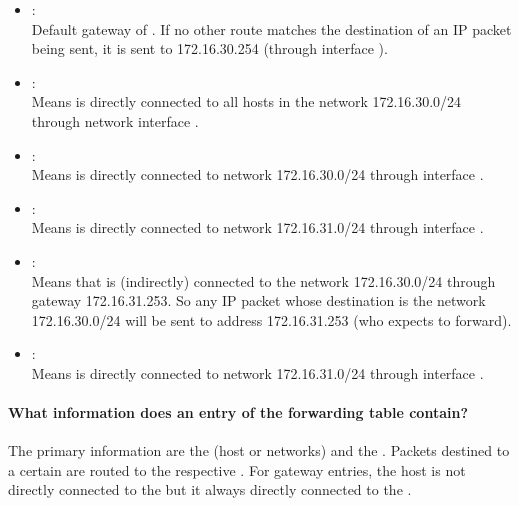 \documentclass[compilation.tex]{subfiles}
\begin{document}
\begin{itemize}[noitemsep, leftmargin=*,topsep=0pt]
\item {}: \\
Default gateway of . If no other route matches the destination of an IP packet being sent, it is sent to 172.16.30.254 (through interface ).

\item {}: \\
Means  is directly connected to all hosts in the network 172.16.30.0/24 through network interface .

\item {}: \\
Means  is directly connected to network 172.16.30.0/24 through interface .
\end{itemize}%

\begin{itemize}[noitemsep, leftmargin=*,topsep=0pt]
\item {}: \\
Means  is directly connected to network 172.16.31.0/24 through interface .

\item {}: \\
Means that  is (indirectly) connected to the network 172.16.30.0/24 through gateway 172.16.31.253. So any IP packet whose destination is the network 172.16.30.0/24 will be sent to address 172.16.31.253 (who  expects to forward).

\item {}: \\
Means  is directly connected to network 172.16.31.0/24 through interface .
\end{itemize}%

\paragraph{What information does an entry of the forwarding table contain?}
The primary information are the  (host or networks) and the . Packets destined to a certain  are routed to the respective . For gateway entries, the host is not directly connected to the  but it always directly connected to the .
\end{document}
